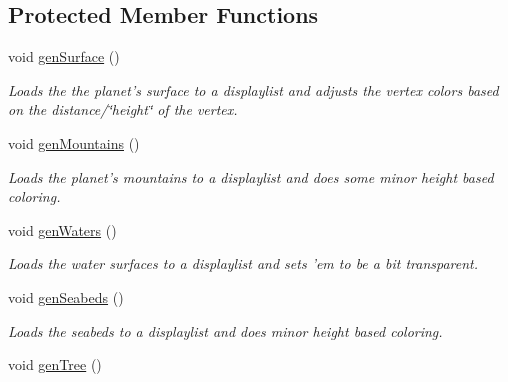 \subsection*{Protected Member Functions}
\begin{DoxyCompactItemize}
\item 
\hypertarget{classPlanet_ab590fe73444345deb28aad1a74684dc4}{
void \hyperlink{classPlanet_ab590fe73444345deb28aad1a74684dc4}{genSurface} ()}
\label{classPlanet_ab590fe73444345deb28aad1a74684dc4}

\begin{DoxyCompactList}\small\item\em Loads the the planet's surface to a displaylist and adjusts the vertex colors based on the distance/\char`\"{}height\char`\"{} of the vertex. \item\end{DoxyCompactList}\item 
\hypertarget{classPlanet_a1cb39a0e606ac2a787246132f317b091}{
void \hyperlink{classPlanet_a1cb39a0e606ac2a787246132f317b091}{genMountains} ()}
\label{classPlanet_a1cb39a0e606ac2a787246132f317b091}

\begin{DoxyCompactList}\small\item\em Loads the planet's mountains to a displaylist and does some minor height based coloring. \item\end{DoxyCompactList}\item 
\hypertarget{classPlanet_af5f1a56cdca0032d11e0fc832fa4e651}{
void \hyperlink{classPlanet_af5f1a56cdca0032d11e0fc832fa4e651}{genWaters} ()}
\label{classPlanet_af5f1a56cdca0032d11e0fc832fa4e651}

\begin{DoxyCompactList}\small\item\em Loads the water surfaces to a displaylist and sets 'em to be a bit transparent. \item\end{DoxyCompactList}\item 
\hypertarget{classPlanet_af36ec7e21f002d8b41fdaa579473061f}{
void \hyperlink{classPlanet_af36ec7e21f002d8b41fdaa579473061f}{genSeabeds} ()}
\label{classPlanet_af36ec7e21f002d8b41fdaa579473061f}

\begin{DoxyCompactList}\small\item\em Loads the seabeds to a displaylist and does minor height based coloring. \item\end{DoxyCompactList}\item 
\hypertarget{classPlanet_ae748a8851f98ced09160dd5f32b66ce8}{
void \hyperlink{classPlanet_ae748a8851f98ced09160dd5f32b66ce8}{genTree} ()}
\label{classPlanet_ae748a8851f98ced09160dd5f32b66ce8}


\end{DoxyCompactItemize}
